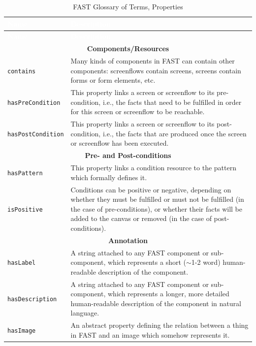 \documentclass{fast_latex}
\begin{document}
\singlespacing
\begin{small}
\begin{longtable}{|p{3.25cm}|p{11cm}|}
\caption{\label{tab:glossary_of_terms_properties}FAST Glossary of Terms, Properties}\\
\hline
\rowcolor{fast@lightgrey}\textcolor{white}{\textbf{Name}} & 
	\textcolor{white}{\textbf{Description}} \\ \hline
\endfirsthead
\rowcolor{fast@lightgrey}\textcolor{white}{\textbf{Name}} & 
	\textcolor{white}{\textbf{Description}} \\ \hline
\endhead
\multicolumn{2}{|c|}{\textbf{Components/Resources}} \\ \hline
\texttt{contains} & Many kinds of components in FAST can contain other components: screenflows contain screens, screens contain forms or form elements, etc. \\ \hline
\texttt{hasPreCondition} & This property links a screen or screenflow to its pre-condition, i.e., the facts that need to be fulfilled in order for this screen or screenflow to be reachable. \\ \hline
\texttt{hasPostCondition} & This property links a screen or screenflow to its post-condition, i.e., the facts that are produced once the screen or screenflow has been executed. \\ \hline
\multicolumn{2}{|c|}{\textbf{Pre- and Post-conditions}} \\ \hline
\texttt{hasPattern} & This property links a condition resource to the pattern which formally defines it. \\ \hline
\texttt{isPositive} & Conditions can be positive or negative, depending on whether they must be fulfilled or must not be fulfilled (in the case of pre-conditions), or whether their facts will be added to the canvas or removed (in the case of post-conditions). \\ \hline
\multicolumn{2}{|c|}{\textbf{Annotation}} \\ \hline
\texttt{hasLabel} & A string attached to any FAST component or sub-component, which represents a short ($\sim$1-2 word) human-readable description of the component. \\ \hline
\texttt{hasDescription} & A string attached to any FAST component or sub-component, which represents a longer, more detailed human-readable description of the component in natural language. \\ \hline
\texttt{hasImage} & An abstract property defining the relation between a thing in FAST and an image which somehow represents it. \\ \hline

\end{longtable}
\end{small}
\end{document}
